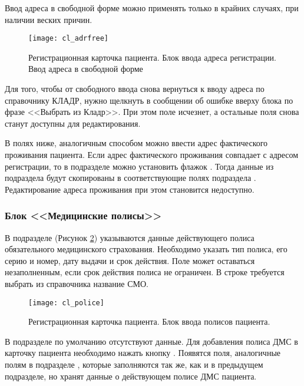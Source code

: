 \begin{vnim}
Ввод адреса в свободной форме можно применять только в крайних случаях, при наличии веских причин. 
\end{vnim}

\begin{figure}[ht]\centering
 \texttt{[image: cl\_adrfree]}
 \caption{Регистрационная карточка пациента. Блок ввода адреса регистрации. Ввод адреса в свободной форме}
 \label{img_cl_adrfree}
\end{figure}   

\begin{prim}
Для того, чтобы от свободного ввода снова вернуться к вводу адреса по справочнику КЛАДР, нужно щелкнуть в сообщении об ошибке вверху блока по фразе <<Выбрать из Кладр>>. При этом поле  исчезнет, а остальные поля снова станут доступны для редактирования.
\end{prim}

В полях ниже, аналогичным способом можно ввести адрес фактического проживания пациента. Если адрес фактического проживания совпадает с адресом регистрации, то в подразделе  можно установить флажок . Тогда данные из подраздела  будут скопированы в соответствующие полях подраздела . Редактирование адреса проживания при этом становится недоступно. 
 
\subsubsection{Блок <<Медицинские полисы>>}
  
В подразделе  (Рисунок \ref{img_cl_police}) указываются данные действующего полиса обязательного медицинского страхования. Необходимо указать тип полиса, его серию и номер, дату выдачи и срок действия. Поле  может оставаться незаполненным, если срок действия полиса не ограничен. В строке  требуется выбрать из справочника название СМО.

\begin{figure}[ht]\centering
 \texttt{[image: cl\_police]}
 \caption{Регистрационная карточка пациента. Блок ввода полисов пациента.}
 \label{img_cl_police}
\end{figure}  

В подразделе  по умолчанию отсутствуют данные. Для добавления полиса ДМС в карточку пациента необходимо нажать кнопку . Появятся поля, аналогичные полям в подразделе , которые заполняются так же, как и в предыдущем подразделе, но хранят данные о действующем полисе ДМС пациента.

